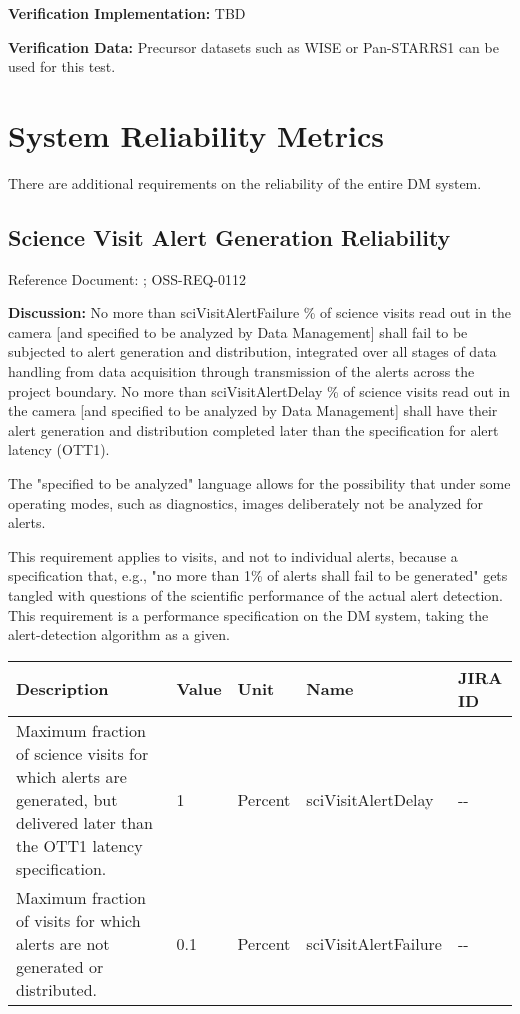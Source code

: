 \documentclass[DM,lsstdraft,toc]{lsstdoc}
\begin{document}
\textbf{Verification Implementation:} TBD

\textbf{Verification Data:} Precursor datasets such as WISE or
Pan-STARRS1 can be used for this test.

\section{System Reliability Metrics}\label{system-reliability-metrics}

There are additional requirements on the reliability of the entire DM
system.

\subsection{Science Visit Alert Generation
Reliability}\label{science-visit-alert-generation-reliability}

Reference Document: ; OSS-REQ-0112

\textbf{Discussion:} No more than sciVisitAlertFailure \% of science
visits read out in the camera {[}and specified to be analyzed by Data
Management{]} shall fail to be subjected to alert generation and
distribution, integrated over all stages of data handling from data
acquisition through transmission of the alerts across the project
boundary. No more than sciVisitAlertDelay \% of science visits read out
in the camera {[}and specified to be analyzed by Data Management{]}
shall have their alert generation and distribution completed later than
the \SRD specification for alert latency (OTT1).

The "specified to be analyzed" language allows for the possibility that
under some operating modes, such as diagnostics, images deliberately not
be analyzed for alerts.

This requirement applies to visits, and not to individual alerts,
because a specification that, e.g., "no more than 1\% of alerts shall
fail to be generated" gets tangled with questions of the scientific
performance of the actual alert detection. This requirement is a
performance specification on the DM system, taking the alert-detection
algorithm as a given.

\begin{longtable}[]{@{}p{}llll@{}}
\toprule
Description & Value & Unit & Name & JIRA ID\tabularnewline
\midrule
\endhead
Maximum fraction of science visits for which alerts are generated, but
delivered later than the OTT1 latency specification. & 1 & Percent &
sciVisitAlertDelay & -\/-\tabularnewline
Maximum fraction of visits for which alerts are not generated or
distributed. & 0.1 & Percent & sciVisitAlertFailure &
-\/-\tabularnewline
\bottomrule
\end{longtable}
\end{document}
